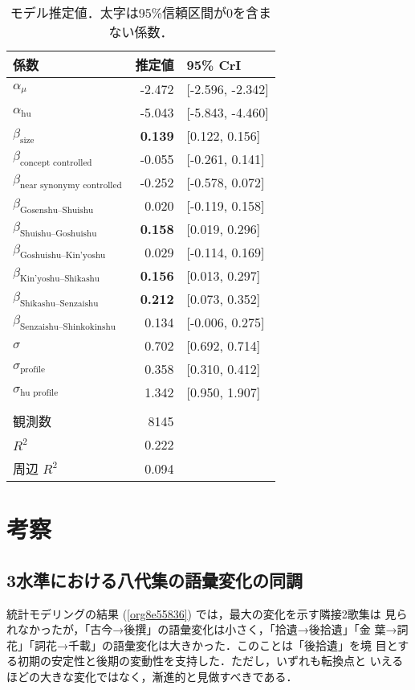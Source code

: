 \documentclass[submit]{ipsj}
\renewcommand{\ref}{\cref}
\begin{document}
\begin{table}[b]
\caption{\label{tab:org5e7a9e6}モデル推定値．太字は95\%信頼区間が0を含まない係数．}
\centering
\begin{tabular}{lrl}
係数 & 推定値 & 95\% CrI\\
\hline
\(\alpha_{\mu}\) & -2.472 & {[}-2.596, -2.342]\\
\(\alpha_{\text{hu}}\) & -5.043 & {[}-5.843, -4.460]\\
\(\beta_{\text{size}}\) & \textbf{0.139} & {[}0.122, 0.156]\\
\(\beta_{\text{concept controlled}}\) & -0.055 & {[}-0.261, 0.141]\\
\(\beta_{\text{near synonymy controlled}}\) & -0.252 & {[}-0.578, 0.072]\\
\(\beta_{\text{Gosenshu--Shuishu}}\) & 0.020 & {[}-0.119, 0.158]\\
\(\beta_{\text{Shuishu--Goshuishu}}\) & \textbf{0.158} & {[}0.019, 0.296]\\
\(\beta_{\text{Goshuishu--Kin'yoshu}}\) & 0.029 & {[}-0.114, 0.169]\\
\(\beta_{\text{Kin'yoshu--Shikashu}}\) & \textbf{0.156} & {[}0.013, 0.297]\\
\(\beta_{\text{Shikashu--Senzaishu}}\) & \textbf{0.212} & {[}0.073, 0.352]\\
\(\beta_{\text{Senzaishu--Shinkokinshu}}\) & 0.134 & {[}-0.006, 0.275]\\
\(\sigma\) & 0.702 & {[}0.692, 0.714]\\
\(\sigma_{\text{profile}}\) & 0.358 & {[}0.310, 0.412]\\
\(\sigma_{\text{hu profile}}\) & 1.342 & {[}0.950, 1.907]\\
 &  & \\
観測数 & 8145 & \\
\(R^2\) & 0.222 & \\
周辺 \(R^2\) & 0.094 & \\
\end{tabular}
\end{table}
\section{考察\label{org8bd1c58}}
\label{sec:org508bfe3}
\subsection{3水準における八代集の語彙変化の同調\label{org0f13d48}}
\label{sec:orgace4c70}
統計モデリングの結果 (\ref{org8e55836}) では，最大の変化を示す隣接2歌集は
見られなかったが，「古今→後撰」の語彙変化は小さく，「拾遺→後拾遺」「金
葉→詞花」「詞花→千載」の語彙変化は大きかった．このことは「後拾遺」を境
目とする初期の安定性と後期の変動性を支持した．ただし，いずれも転換点と
いえるほどの大きな変化ではなく，漸進的と見做すべきである．
\end{document}
